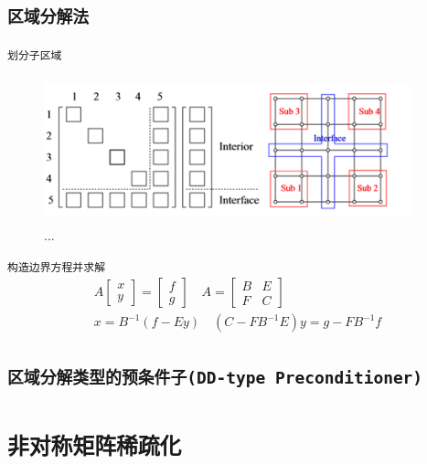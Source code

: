 \documentclass[11pt, a4paper]{article}
\theoremstyle{plain}
\theoremstyle{plain}
\theoremstyle{plain}
\theoremstyle{definition}
\theoremstyle{remark}
\theoremstyle{definition}
\newcommand{\T}[1]{\texttt{#1}}
\begin{document}
\subsection{\T{区域分解法}}
\T{划分子区域}
\begin{figure}[H]
	\caption{...\cite{SLR}}
	\centering
	\includegraphics[width=300pt,height=120pt]{SLR.png}
\end{figure}
\T{构造边界方程并求解}
\begin{equation}
	\begin{aligned}
		A \begin{bmatrix}
			x \\ y
		\end{bmatrix} = \begin{bmatrix}
			f \\ g 
		\end{bmatrix} \quad A = \begin{bmatrix}
			B & E \\ F & C
		\end{bmatrix} \\ 
		x = B^{-1}(f - E y) \quad 
		(C - F B ^{-1} E) y = g - F B^{-1} f
	\end{aligned}
\end{equation}

\subsection{\T{区域分解类型的预条件子(DD-type Preconditioner)}}



\section{\T{非对称矩阵稀疏化}}
\cite{Sparse}
\end{document}
